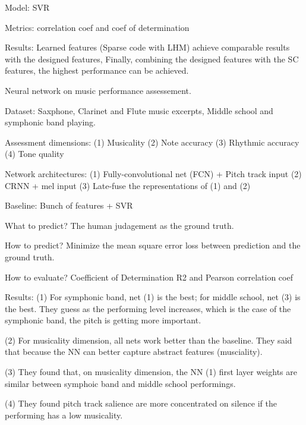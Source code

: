 Model:
SVR

Metrics:
correlation coef and coef of determination

Results:
Learned features (Sparse code with LHM) achieve comparable results with the designed features,  Finally, combining the designed features with the SC features, the highest performance can be achieved.

 Neural network on music performance assessement.

Dataset: Saxphone, Clarinet and Flute music excerpts, Middle school and symphonic band playing.

Assessment dimensions: (1) Musicality (2) Note accuracy (3) Rhythmic accuracy (4) Tone quality

Network architectures:
(1) Fully-convolutional net (FCN) + Pitch track input
(2) CRNN + mel input
(3) Late-fuse the representations of (1) and (2)

Baseline:
Bunch of features + SVR

What to predict?
The human judagement as the ground truth.

How to predict?
Minimize the mean square error loss between prediction and the ground truth.

How to evaluate?
Coefficient of Determination R2 and Pearson correlation coef

Results:
(1) For symphonic band, net (1) is the best; for middle school, net (3) is the best. They guess as the performing level increases, which is the case of the symphonic band, the pitch is getting more important.

(2) For musicality dimension, all nets work better than the baseline. They said that because the NN can better capture abstract features (musciality).

(3) They found that, on musicality dimension, the NN (1) first layer weights are similar between symphoic band and middle school performings.

(4) They found pitch track salience are more concentrated on silence if the performing has a low musicality.

